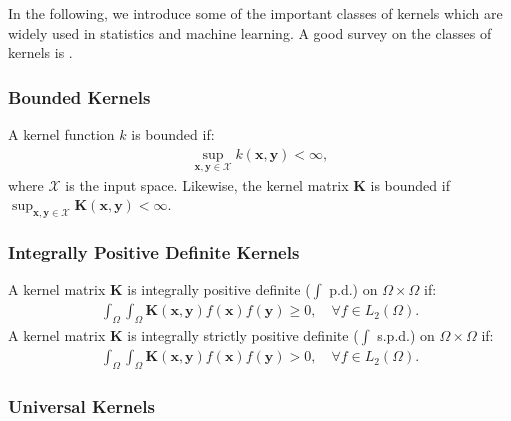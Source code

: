 \documentclass[lang=cn,10pt]{gorgeousnbook}
\numberwithin{equation}{section}%
\numberwithin{figure}{section}%
\begin{document}
In the following, we introduce some of the important classes of kernels which are widely used in statistics and machine learning. A good survey on the classes of kernels is \cite{genton2001classes}.


\subsubsection{Bounded Kernels}

\begin{definition}
A kernel function $k$ is bounded if:
\begin{align}
\sup_{\boldsymbol{x}, \boldsymbol{y} \in \mathcal{X}} k(\boldsymbol{x}, \boldsymbol{y}) < \infty, 
\end{align}
where $\mathcal{X}$ is the input space. Likewise, the kernel matrix $\boldsymbol{K}$ is bounded if $\sup_{\boldsymbol{x}, \boldsymbol{y} \in \mathcal{X}} \boldsymbol{K}(\boldsymbol{x}, \boldsymbol{y}) < \infty$.
\end{definition}

\subsubsection{Integrally Positive Definite Kernels}\label{section_integrally_positive_definite_kernels}

\begin{definition}
A kernel matrix $\boldsymbol{K}$ is integrally positive definite ($\int$ p.d.) on $\Omega \times \Omega$ if:
\begin{align}
\int_\Omega \int_\Omega \boldsymbol{K}(\boldsymbol{x}, \boldsymbol{y}) f(\boldsymbol{x}) f(\boldsymbol{y}) \geq 0, \quad \forall f \in L_2(\Omega).
\end{align}
A kernel matrix $\boldsymbol{K}$ is integrally strictly positive definite ($\int$ s.p.d.) on $\Omega \times \Omega$ if:
\begin{align}
\int_\Omega \int_\Omega \boldsymbol{K}(\boldsymbol{x}, \boldsymbol{y}) f(\boldsymbol{x}) f(\boldsymbol{y}) > 0, \quad \forall f \in L_2(\Omega).
\end{align}
\end{definition}



\subsubsection{Universal Kernels}\label{section_universal_kernels}
\end{document}
